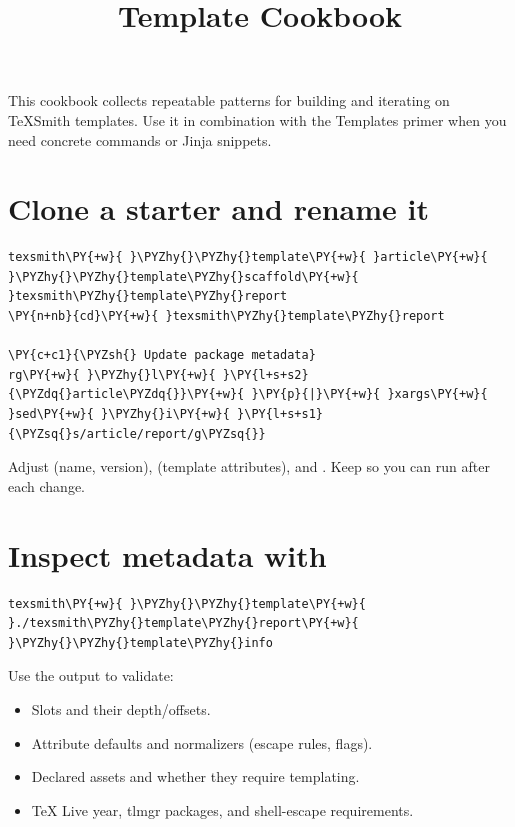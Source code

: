 \documentclass[a4paper,twoside]{article}
\title{Template Cookbook}
\author{}\date{}
\begin{document}
\maketitle
This cookbook collects repeatable patterns for building and iterating on TeXSmith templates. Use it in combination with the Templates primer when you need concrete commands or Jinja snippets.
\section{Clone a starter and rename it}
\begin{tscode}[lang=bash, engine=pygments]
\begin{Verbatim}[commandchars=\\\{\},breaklines, breakanywhere, commandchars=\\\{\}]
texsmith\PY{+w}{ }\PYZhy{}\PYZhy{}template\PY{+w}{ }article\PY{+w}{ }\PYZhy{}\PYZhy{}template\PYZhy{}scaffold\PY{+w}{ }texsmith\PYZhy{}template\PYZhy{}report
\PY{n+nb}{cd}\PY{+w}{ }texsmith\PYZhy{}template\PYZhy{}report

\PY{c+c1}{\PYZsh{} Update package metadata}
rg\PY{+w}{ }\PYZhy{}l\PY{+w}{ }\PY{l+s+s2}{\PYZdq{}article\PYZdq{}}\PY{+w}{ }\PY{p}{|}\PY{+w}{ }xargs\PY{+w}{ }sed\PY{+w}{ }\PYZhy{}i\PY{+w}{ }\PY{l+s+s1}{\PYZsq{}s/article/report/g\PYZsq{}}
\end{Verbatim}
\end{tscode}
Adjust  (name, version),  (template attributes), and . Keep  so you can run  after each change.
\section{Inspect metadata with }
\begin{tscode}[lang=bash, engine=pygments]
\begin{Verbatim}[commandchars=\\\{\},breaklines, breakanywhere, commandchars=\\\{\}]
texsmith\PY{+w}{ }\PYZhy{}\PYZhy{}template\PY{+w}{ }./texsmith\PYZhy{}template\PYZhy{}report\PY{+w}{ }\PYZhy{}\PYZhy{}template\PYZhy{}info
\end{Verbatim}
\end{tscode}
Use the output to validate:
\begin{itemize}
\item Slots and their depth/offsets.
\item Attribute defaults and normalizers (escape rules,  flags).
\item Declared assets and whether they require templating.
\item \TeX{} Live year, tlmgr packages, and shell-escape requirements.
\end{itemize}
\end{document}
